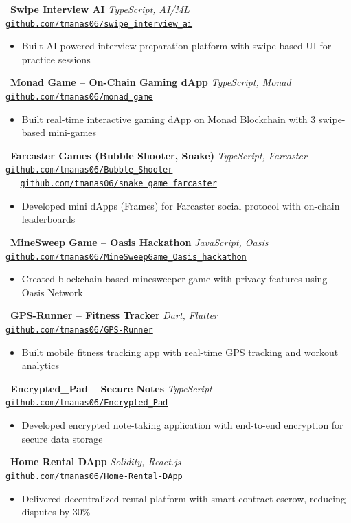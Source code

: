 \documentclass[11pt,a4paper]{article}
\newcommand{\projectentry}[4]{%
  \noindent
  \faGithub\ \textbf{#1} \hfill \textit{#2} \\
  {\small\texttt{#3}}
  \begin{itemize}[leftmargin=1.5em, itemsep=1pt, parsep=0pt, topsep=1.5pt]
    #4
  \end{itemize}
  \vspace{2.5pt}
}
\begin{document}
\newpage
\projectentry{Swipe Interview AI}%
  {TypeScript, AI/ML}%
  {\href{https://github.com/tmanas06/swipe_interview_ai}{github.com/tmanas06/swipe\_interview\_ai}}%
  {\item Built AI-powered interview preparation platform with swipe-based UI for practice sessions}

\projectentry{Monad Game -- On-Chain Gaming dApp}%
  {TypeScript, Monad}%
  {\href{https://github.com/tmanas06/monad_game}{github.com/tmanas06/monad\_game}}%
  {\item Built real-time interactive gaming dApp on Monad Blockchain with 3 swipe-based mini-games}

\projectentry{Farcaster Games (Bubble Shooter, Snake)}%
  {TypeScript, Farcaster}%
  {\href{https://github.com/tmanas06/Bubble_Shooter}{github.com/tmanas06/Bubble\_Shooter} \ \textbar\ \ \href{https://github.com/tmanas06/snake_game_farcaster}{github.com/tmanas06/snake\_game\_farcaster}}%
  {\item Developed mini dApps (Frames) for Farcaster social protocol with on-chain leaderboards}

\projectentry{MineSweep Game -- Oasis Hackathon}%
  {JavaScript, Oasis}%
  {\href{https://github.com/tmanas06/MineSweepGame_Oasis_hackathon}{github.com/tmanas06/MineSweepGame\_Oasis\_hackathon}}%
  {\item Created blockchain-based minesweeper game with privacy features using Oasis Network}

\projectentry{GPS-Runner -- Fitness Tracker}%
  {Dart, Flutter}%
  {\href{https://github.com/tmanas06/GPS-Runner}{github.com/tmanas06/GPS-Runner}}%
  {\item Built mobile fitness tracking app with real-time GPS tracking and workout analytics}

\projectentry{Encrypted\_Pad -- Secure Notes}%
  {TypeScript}%
  {\href{https://github.com/tmanas06/Encrypted_Pad}{github.com/tmanas06/Encrypted\_Pad}}%
  {\item Developed encrypted note-taking application with end-to-end encryption for secure data storage}

\projectentry{Home Rental DApp}%
  {Solidity, React.js}%
  {\href{https://github.com/tmanas06/Home-Rental-DApp}{github.com/tmanas06/Home-Rental-DApp}}%
  {\item Delivered decentralized rental platform with smart contract escrow, reducing disputes by 30\%}
\end{document}
